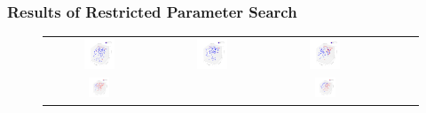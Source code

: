 \documentclass{beamer}
\begin{document}
\frame
{
  \frametitle{Results of Restricted Parameter Search}
  \begin{figure}[H]
  \centering
        \begin{tabular}{@{}cc@{}cc@{}cc@{}}
                \includegraphics[width = 0.3\textwidth]{./pics/Restricted_Parameter_space_d2500_w250.png} &
                \includegraphics[width = 0.3\textwidth]{./pics/Restricted_Parameter_space_d3000_w500.png} &
                \includegraphics[width = 0.3\textwidth]{./pics/Restricted_Parameter_space_d2000_w2000.png} \\
                \includegraphics[width = 0.2\textwidth]{./pics/Restricted_Parameter_space_d500_w3000.png} &&
		\includegraphics[width = 0.2\textwidth]{./pics/Restricted_Parameter_space_d250_w2500.png} \\
        \end{tabular}
        \label{RestrictParam}
  \end{figure}

}
\end{document}
